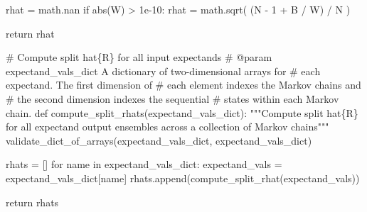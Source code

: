 \documentclass[
  letterpaper,
  DIV=11,
  numbers=noendperiod]{scrartcl}
\newenvironment{Shaded}{\begin{snugshade}}{\end{snugshade}}
\newcommand{\BuiltInTok}[1]{\textcolor[rgb]{0.00,0.23,0.31}{#1}}
\newcommand{\CommentTok}[1]{\textcolor[rgb]{0.37,0.37,0.37}{#1}}
\newcommand{\ControlFlowTok}[1]{\textcolor[rgb]{0.00,0.23,0.31}{#1}}
\newcommand{\DecValTok}[1]{\textcolor[rgb]{0.68,0.00,0.00}{#1}}
\newcommand{\FloatTok}[1]{\textcolor[rgb]{0.68,0.00,0.00}{#1}}
\newcommand{\KeywordTok}[1]{\textcolor[rgb]{0.00,0.23,0.31}{#1}}
\newcommand{\NormalTok}[1]{\textcolor[rgb]{0.00,0.23,0.31}{#1}}
\newcommand{\OperatorTok}[1]{\textcolor[rgb]{0.37,0.37,0.37}{#1}}
\newcommand{\StringTok}[1]{\textcolor[rgb]{0.13,0.47,0.30}{#1}}
\begin{document}
\begin{Shaded}
\begin{Highlighting}[]
\NormalTok{  rhat }\OperatorTok{=}\NormalTok{ math.nan}
  \ControlFlowTok{if} \BuiltInTok{abs}\NormalTok{(W) }\OperatorTok{\textgreater{}} \FloatTok{1e{-}10}\NormalTok{:}
\NormalTok{    rhat }\OperatorTok{=}\NormalTok{ math.sqrt( (N }\OperatorTok{{-}} \DecValTok{1} \OperatorTok{+}\NormalTok{ B }\OperatorTok{/}\NormalTok{ W) }\OperatorTok{/}\NormalTok{ N )}

  \ControlFlowTok{return}\NormalTok{ rhat}
\end{Highlighting}
\end{Shaded}

\begin{Shaded}
\begin{Highlighting}[]
\CommentTok{\# Compute split hat\{R\} for all input expectands}
\CommentTok{\# @param expectand\_vals\_dict A dictionary of two{-}dimensional arrays for}
\CommentTok{\#                            each expectand.  The first dimension of}
\CommentTok{\#                            each element indexes the Markov chains and}
\CommentTok{\#                            the second dimension indexes the sequential}
\CommentTok{\#                            states within each Markov chain.}
\KeywordTok{def}\NormalTok{ compute\_split\_rhats(expectand\_vals\_dict):}
  \CommentTok{"""Compute split hat\{R\} for all expectand output ensembles across}
\CommentTok{     a collection of Markov chains"""}
\NormalTok{  validate\_dict\_of\_arrays(expectand\_vals\_dict, }\StringTok{\textquotesingle{}expectand\_vals\_dict\textquotesingle{}}\NormalTok{)}

\NormalTok{  rhats }\OperatorTok{=}\NormalTok{ []}
  \ControlFlowTok{for}\NormalTok{ name }\KeywordTok{in}\NormalTok{ expectand\_vals\_dict:}
\NormalTok{    expectand\_vals }\OperatorTok{=}\NormalTok{ expectand\_vals\_dict[name]}
\NormalTok{    rhats.append(compute\_split\_rhat(expectand\_vals))}

  \ControlFlowTok{return}\NormalTok{ rhats}
\end{Highlighting}
\end{Shaded}
\end{document}
